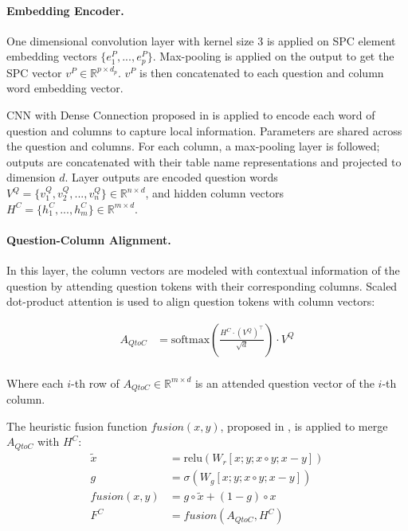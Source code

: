 \documentclass[11pt,a4paper]{article}
\begin{document}
\paragraph{Embedding Encoder.} One dimensional convolution layer with kernel size 3 is applied on SPC element embedding vectors $\{e^P_1, ..., e^P_p\}$. Max-pooling is applied on the output to get the SPC vector $v^P \in \mathbb{R}^{p \times d_p}$. $v^P$ is then concatenated to each question and column word embedding vector. 

CNN with Dense Connection proposed in \citet{Yoon18} is applied to encode each word of question and columns to capture local information. Parameters are shared across the question and columns. For each column, a max-pooling layer is followed; outputs are concatenated with their table name representations and projected to dimension $d$. Layer outputs are encoded question words $V^Q=\{v^Q_1, v^Q_2, ..., v^Q_n\} \in \mathbb{R}^{n \times d}$, and hidden column vectors $H^C = \{h^C_1, ..., h^C_m\} \in \mathbb{R}^{m \times d}$.

\paragraph{Question-Column Alignment.} In this layer, the column vectors are modeled with contextual information of the question by attending question tokens with their corresponding columns. Scaled dot-product attention \citep{transformer} is used to align question tokens with column vectors:

\begin{equation}
\begin{aligned}
A_{QtoC} &=\text{softmax}( \frac{H^C \cdot (V^Q)^\intercal}{\sqrt{d}} ) \cdot V^Q \\
\end{aligned}
\end{equation}

Where each $i$-th row of $A_{QtoC} \in \mathbb{R}^{m \times d}$ is an attended question vector of the $i$-th column.

The heuristic fusion function $fusion(x,y)$, proposed in \citet{mnemonic}, is applied to merge $A_{QtoC}$ with $H^C$:
\begin{align}
\tilde{x} &= \text{relu}(W_r[x;y;x \circ y; x - y ]) \nonumber \\ 
g &= \sigma (W_g[x;y;x \circ y; x - y ]) \nonumber \\ 
fusion(x,y) &= g \circ \tilde{x} + ( 1 -g ) \circ x \nonumber \\
F^C &= fusion( A_{QtoC}, H^C ) 
\end{align}
\end{document}
